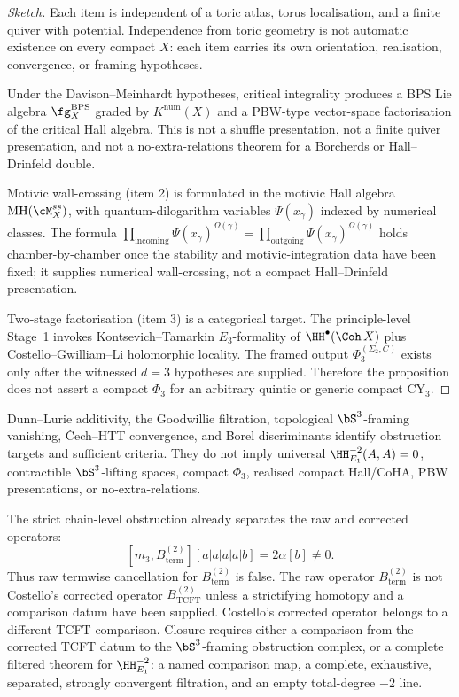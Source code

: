 \begin{proof}[Sketch]
Each item is independent of a toric atlas, torus localisation, and a
finite quiver with potential. Independence from toric geometry is not
automatic existence on every compact $X$: each item carries its own
orientation, realisation, convergence, or framing hypotheses.

Under the Davison--Meinhardt hypotheses, critical integrality produces
a BPS Lie algebra $\fg_X^{\mathrm{BPS}}$ graded by
$K^{\mathrm{num}}(X)$ and a PBW-type vector-space factorisation of the
critical Hall algebra. This is not a shuffle presentation, not a finite
quiver presentation, and not a no-extra-relations theorem for a
Borcherds or Hall--Drinfeld double.

Motivic wall-crossing (item 2) is formulated in the motivic Hall
algebra $\mathrm{MH}(\cM_X^{ss})$, with quantum-dilogarithm variables
$\Psi(x_\gamma)$ indexed by numerical classes. The formula
$\prod_{\mathrm{incoming}} \Psi(x_\gamma)^{\Omega(\gamma)} =
\prod_{\mathrm{outgoing}} \Psi(x_\gamma)^{\Omega(\gamma)}$ holds
chamber-by-chamber once the stability and motivic-integration data have
been fixed; it supplies numerical wall-crossing, not a compact
Hall--Drinfeld presentation.

Two-stage factorisation (item 3) is a categorical target. The
principle-level Stage~1 invokes Kontsevich--Tamarkin $E_3$-formality of
$\HH^\bullet(\Coh\,X)$ plus Costello--Gwilliam--Li holomorphic locality.
The framed output $\Phi_3^{(\Sigma_2,C)}$ exists only after the
witnessed $d=3$ hypotheses are supplied. Therefore the proposition
does not assert a compact $\Phi_3$ for an arbitrary quintic or generic
compact CY$_3$.
\end{proof}

\begin{remark}
\label{rem:framing-diagnostics-not-closure}
Dunn--Lurie additivity, the Goodwillie filtration, topological
$\bS^3$-framing vanishing, \v{C}ech--HTT convergence, and Borel
discriminants identify obstruction targets and sufficient criteria.
They do not imply universal
$\HH^{-2}_{E_1}(A,A)=0$, contractible $\bS^3$-lifting spaces, compact
$\Phi_3$, realised compact Hall/CoHA, PBW presentations, or
no-extra-relations.

The strict chain-level obstruction already separates the raw and
corrected operators:
\[
 [m_3,B_{\mathrm{term}}^{(2)}][a|a|a|a|b]
 =
 2\alpha[b]\neq 0 .
\]
Thus raw termwise cancellation for $B_{\mathrm{term}}^{(2)}$ is false.
The raw operator $B_{\mathrm{term}}^{(2)}$ is not Costello's corrected
operator $B_{\mathrm{TCFT}}^{(2)}$ unless a strictifying homotopy and a
comparison datum have been supplied. Costello's corrected operator
belongs to a different TCFT comparison. Closure requires either a
comparison from the corrected TCFT datum to the $\bS^3$-framing
obstruction complex, or a complete filtered theorem for
$\HH^{-2}_{E_1}$: a named comparison map, a complete, exhaustive,
separated, strongly convergent filtration, and an empty total-degree
$-2$ line.
\end{remark}


